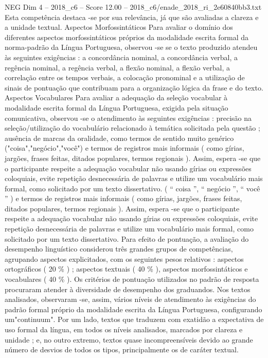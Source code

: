 \begin{textsample}{NEG Dim 4 – 2018\_c6 – Score 12.00 – 2018\_c6/enade\_2018\_ri\_2e60840bb3.txt}
Esta competência destaca -se por sua relevância, já que são avaliadas a clareza e a unidade textual.
Aspectos Morfossintáticos Para avaliar o domínio dos diferentes aspectos morfossintáticos próprios da modalidade escrita formal da norma-padrão da Língua Portuguesa, observou -se se o texto produzido atendeu às seguintes exigências : a concordância nominal, a concordância verbal, a regência nominal, a regência verbal, a flexão nominal, a flexão verbal, a correlação entre os tempos verbais, a colocação pronominal e a utilização de sinais de pontuação que contribuam para a organização lógica da frase e do texto.
Aspectos Vocabulares Para avaliar a adequação da seleção vocabular à modalidade escrita formal da Língua Portuguesa, exigida pela situação comunicativa, observou -se o atendimento às seguintes exigências : precisão na seleção/utilização do vocabulário relacionado à temática solicitada pela questão ; ausência de marcas da oralidade, como termos de sentido muito genérico ("coisa","negócio","você") e termos de registros mais informais ( como gírias, jargões, frases feitas, ditados populares, termos regionais ).
Assim, espera -se que o participante respeite a adequação vocabular não usando gírias ou expressões coloquiais, evite repetição desnecessária de palavras e utilize um vocabulário mais formal, como solicitado por um texto dissertativo. ( “ coisa ”, “ negócio ”, “ você ” ) e termos de registros mais informais ( como gírias, jargões, frases feitas, ditados populares, termos regionais ).
Assim, espera -se que o participante respeite a adequação vocabular não usando gírias ou expressões coloquiais, evite repetição desnecessária de palavras e utilize um vocabulário mais formal, como solicitado por um texto dissertativo.
Para efeito de pontuação, a avaliação do desempenho linguístico considerou três grandes grupos de competências, agrupando aspectos explicitados, com os seguintes pesos relativos : aspectos ortográficos ( 20 \% ) ; aspectos textuais ( 40 \% ), aspectos morfossintáticos e vocabulares ( 40 \% ).
Os critérios de pontuação utilizados no padrão de resposta procuraram atender à diversidade de desempenho dos graduandos.
Nos textos analisados, observaram -se, assim, vários níveis de atendimento às exigências do padrão formal próprio da modalidade escrita da Língua Portuguesa, configurando um"continuum".
Por um lado, textos que traduzem com exatidão a expectativa de uso formal da língua, em todos os níveis analisados, marcados por clareza e unidade ; e, no outro extremo, textos quase incompreensíveis devido ao grande número de desvios de todos os tipos, principalmente os de caráter textual.

\end{textsample}
